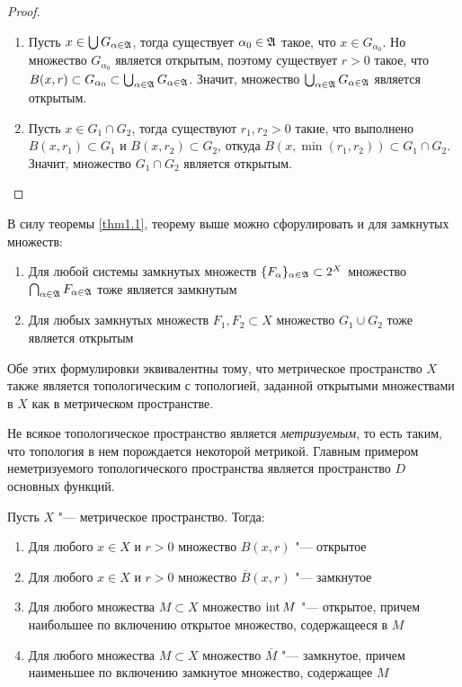 \begin{proof}~
	\begin{enumerate}
		\item Пусть $x \in \bigcup G_{\alpha \in \mathfrak A}$, тогда существует $\alpha_0 \in \mathfrak A$ такое, что $x \in G_{\alpha_0}$. Но множество $G_{\alpha_0}$ является открытым, поэтому существует $r > 0$ такое, что $B(x, r) \subset G_{\alpha_0} \subset \bigcup_{\alpha \in \mathfrak A} G_{\alpha \in \mathfrak A}$. Значит, множество $\bigcup_{\alpha \in \mathfrak A} G_{\alpha \in \mathfrak A}$ является открытым.

		\item Пусть $x \in G_1 \cap G_2$, тогда существуют $r_1, r_2 > 0$ такие, что выполнено $B(x, r_1) \subset G_1$ и $B(x, r_2) \subset G_2$, откуда $B(x, \min(r_1, r_2)) \subset G_1 \cap G_2$. Значит, множество $G_1 \cap G_2$ является открытым.\qedhere
	\end{enumerate}
\end{proof}

\begin{note}
	В силу теоремы \ref{thm1.1}, теорему выше можно сфорулировать и для замкнутых множеств:
	\begin{enumerate}
		\item Для любой системы замкнутых множеств $\{F_\alpha\}_{\alpha \in \mathfrak A} \subset 2^X$ множество $\bigcap_{\alpha \in \mathfrak A} F_{\alpha \in \mathfrak A}$ тоже является замкнутым

		\item Для любых замкнутых множеств $F_1, F_2 \subset X$ множество $G_1 \cup G_2$ тоже является открытым
	\end{enumerate}

	Обе этих формулировки эквивалентны тому, что метрическое пространство $X$ также является топологическим с топологией, заданной открытыми множествами в $X$ как в метрическом пространстве.
\end{note}

\begin{note}
	Не всякое топологическое пространство является \textit{метризуемым}, то есть таким, что топология в нем порождается некоторой метрикой. Главным примером неметризуемого топологического пространства является пространство $D$ основных функций.
\end{note}

\begin{theorem}\label{thm1.3}
	Пусть $X$ "--- метрическое пространство. Тогда:
	\begin{enumerate}
		\item Для любого $x \in X$ и $r > 0$ множество $B(x, r)$ "--- открытое
		\item Для любого $x \in X$ и $r > 0$ множество $\overline B(x, r)$ "--- замкнутое
		\item Для любого множества $M \subset X$ множество $\operatorname{int} M$ "--- открытое, причем наибольшее по включению открытое множество, содержащееся в $M$
		\item Для любого множества $M \subset X$ множество $\overline M$ "--- замкнутое, причем наименьшее по включению замкнутое множество, содержащее $M$
	\end{enumerate}
\end{theorem}

